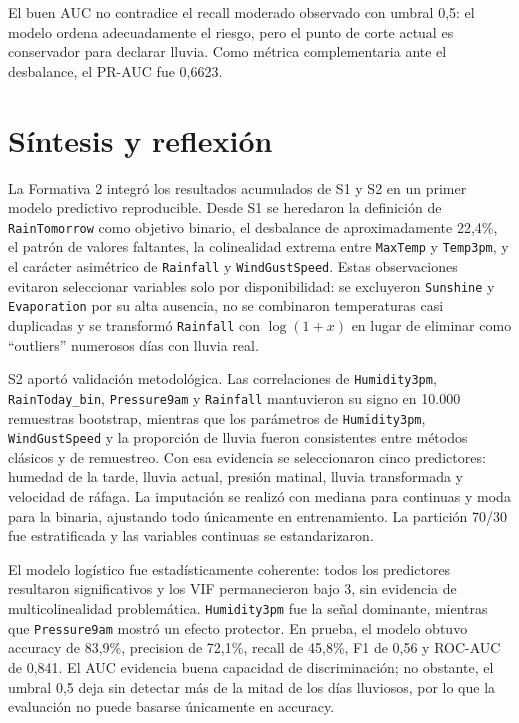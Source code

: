 \documentclass[11pt,a4paper]{article}
\begin{document}
El buen AUC no contradice el recall moderado observado con umbral 0,5: el modelo ordena adecuadamente el riesgo, pero el punto de corte actual es conservador para declarar lluvia. Como métrica complementaria ante el desbalance, el PR-AUC fue 0,6623.

\section{Síntesis y reflexión}
La Formativa 2 integró los resultados acumulados de S1 y S2 en un primer modelo predictivo reproducible. Desde S1 se heredaron la definición de \texttt{RainTomorrow} como objetivo binario, el desbalance de aproximadamente 22,4\%, el patrón de valores faltantes, la colinealidad extrema entre \texttt{MaxTemp} y \texttt{Temp3pm}, y el carácter asimétrico de \texttt{Rainfall} y \texttt{WindGustSpeed}. Estas observaciones evitaron seleccionar variables solo por disponibilidad: se excluyeron \texttt{Sunshine} y \texttt{Evaporation} por su alta ausencia, no se combinaron temperaturas casi duplicadas y se transformó \texttt{Rainfall} con \(\log(1+x)\) en lugar de eliminar como ``outliers'' numerosos días con lluvia real.

S2 aportó validación metodológica. Las correlaciones de \texttt{Humidity3pm}, \texttt{RainToday\_bin}, \texttt{Pressure9am} y \texttt{Rainfall} mantuvieron su signo en 10.000 remuestras bootstrap, mientras que los parámetros de \texttt{Humidity3pm}, \texttt{WindGustSpeed} y la proporción de lluvia fueron consistentes entre métodos clásicos y de remuestreo. Con esa evidencia se seleccionaron cinco predictores: humedad de la tarde, lluvia actual, presión matinal, lluvia transformada y velocidad de ráfaga. La imputación se realizó con mediana para continuas y moda para la binaria, ajustando todo únicamente en entrenamiento. La partición 70/30 fue estratificada y las variables continuas se estandarizaron.

El modelo logístico fue estadísticamente coherente: todos los predictores resultaron significativos y los VIF permanecieron bajo 3, sin evidencia de multicolinealidad problemática. \texttt{Humidity3pm} fue la señal dominante, mientras que \texttt{Pressure9am} mostró un efecto protector. En prueba, el modelo obtuvo accuracy de 83,9\%, precision de 72,1\%, recall de 45,8\%, F1 de 0,56 y ROC-AUC de 0,841. El AUC evidencia buena capacidad de discriminación; no obstante, el umbral 0,5 deja sin detectar más de la mitad de los días lluviosos, por lo que la evaluación no puede basarse únicamente en accuracy.
\end{document}

